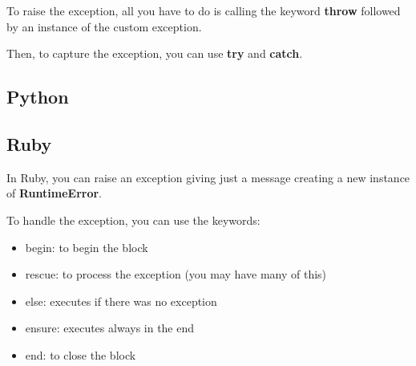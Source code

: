 \documentclass{KodeBook}
\begin{document}
To raise the exception, all you have to do is calling the keyword \textbf{throw} followed by an instance of the custom exception.



Then, to capture the exception, you can use \textbf{try} and \textbf{catch}.



\subsection{Python}









\subsection{Ruby}

In Ruby, you can raise an exception giving just a message creating a new instance of \textbf{RuntimeError}. 



To handle the exception, you can use the keywords: 
\begin{itemize}
	\item begin: to begin the block
	\item rescue: to process the exception (you may have many of this)
	\item else: executes if there was no exception
	\item ensure: executes always in the end
	\item end: to close the block
\end{itemize}


\end{document}
